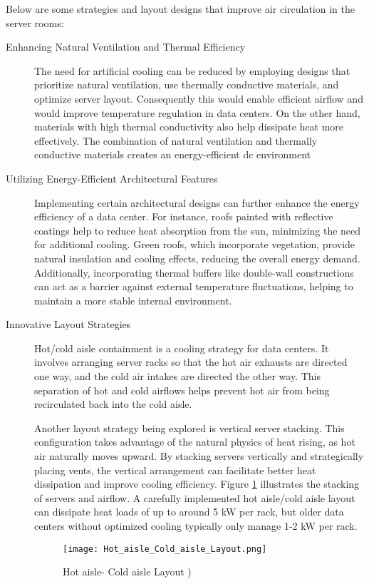 \documentclass[
  a4paper,  %
  twoside,  %
  bibliography=totoc,
  headsepline,
  cleardoublepage=empty,
  parskip=half,
  draft=false
]{scrbook}
\begin{document}
Below are some strategies and layout designs that improve air circulation in the server rooms:
\begin{description}
	
	\item[Enhancing Natural Ventilation and Thermal Efficiency]
	The need for artificial cooling can be reduced by employing designs that prioritize natural ventilation, use thermally conductive materials, and optimize server layout. Consequently this would enable efficient airflow and would improve temperature regulation in data centers. On the other hand, materials with high thermal conductivity also help dissipate heat more effectively. The combination of natural ventilation and thermally conductive materials creates an energy-efficient \gls{dc} environment\cite{zhang2021optimization}\cite{stavreva2023best}
	

	\item[Utilizing Energy-Efficient Architectural Features]
	Implementing certain architectural designs can further enhance the energy efficiency of a data center\cite{moazamigoodarzi2019influence}. For instance, roofs painted with reflective coatings help to reduce heat absorption from the sun, minimizing the need for additional cooling\cite{akbari2003measured}. Green roofs, which incorporate vegetation, provide natural insulation and cooling effects, reducing the overall energy demand\cite{susca2011positive}. Additionally, incorporating thermal buffers like double-wall constructions can act as a barrier against external temperature fluctuations, helping to maintain a more stable internal environment\cite{ewim2023impact}.

	\item[Innovative Layout Strategies]
	Hot/cold aisle containment is a cooling strategy for data centers. It involves arranging server racks so that the hot air exhausts are directed one way, and the cold air intakes are directed the other way. This separation of hot and cold airflows helps prevent hot air from being recirculated back into the cold aisle\cite{jin2020case}\cite{jin2019effects}.
	
	Another layout strategy being explored is vertical server stacking. This configuration takes advantage of the natural physics of heat rising, as hot air naturally moves upward. By stacking servers vertically and strategically placing vents, the vertical arrangement can facilitate better heat dissipation and improve cooling efficiency\cite{jin2020case}\cite{jin2019effects}. Figure \ref{server_layout} illustrates the stacking of servers and airflow. A carefully implemented hot aisle/cold aisle layout can dissipate heat loads of up to around 5 kW per rack, but older data centers without optimized cooling typically only manage 1-2 kW per rack\cite{bhatia2015hvac}.
	
	\begin{figure}
		\centering
		\texttt{[image: Hot\_aisle\_Cold\_aisle\_Layout.png]}
		\caption{Hot aisle- Cold aisle Layout )\cite{bhatia2015hvac}}
		\label{server_layout}
	\end{figure}
	
\end{description}
\end{document}
